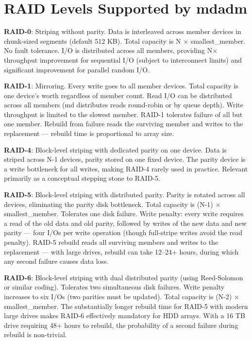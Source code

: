 \section{RAID Levels Supported by mdadm}
\textbf{RAID-0}: Striping without parity. Data is interleaved across member devices in chunk-sized segments (default 512 KB). Total capacity is N $\times$ smallest\_member. No fault tolerance. I/O is distributed across all members, providing N$\times$ throughput improvement for sequential I/O (subject to interconnect limits) and significant improvement for parallel random I/O.

\textbf{RAID-1}: Mirroring. Every write goes to all member devices. Total capacity is one device's worth regardless of member count. Read I/O can be distributed across all members (md distributes reads round-robin or by queue depth). Write throughput is limited to the slowest member. RAID-1 tolerates failure of all but one member. Rebuild from failure reads the surviving member and writes to the replacement --- rebuild time is proportional to array size.

\textbf{RAID-4}: Block-level striping with dedicated parity on one device. Data is striped across N-1 devices, parity stored on one fixed device. The parity device is a write bottleneck for all writes, making RAID-4 rarely used in practice. Relevant primarily as a conceptual stepping stone to RAID-5.

\textbf{RAID-5}: Block-level striping with distributed parity. Parity is rotated across all devices, eliminating the parity disk bottleneck. Total capacity is (N-1) $\times$ smallest\_member. Tolerates one disk failure. Write penalty: every write requires a read of the old data and old parity, followed by writes of the new data and new parity --- four I/Os per write operation (though full-stripe writes avoid the read penalty). RAID-5 rebuild reads all surviving members and writes to the replacement --- with large drives, rebuild can take 12--24+ hours, during which any second failure causes data loss.

\textbf{RAID-6}: Block-level striping with dual distributed parity (using Reed-Solomon or similar coding). Tolerates two simultaneous disk failures. Write penalty increases to six I/Os (two parities must be updated). Total capacity is (N-2) $\times$ smallest\_member. The substantially longer rebuild time for RAID-5 with modern large drives makes RAID-6 effectively mandatory for HDD arrays. With a 16 TB drive requiring 48+ hours to rebuild, the probability of a second failure during rebuild is non-trivial.

